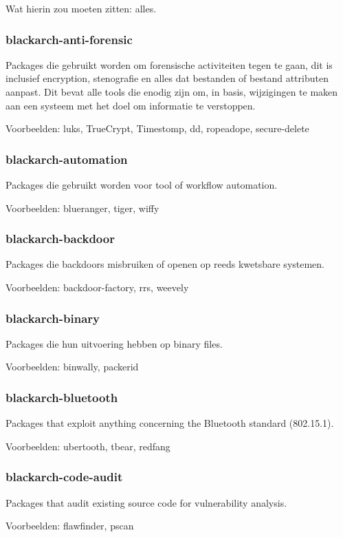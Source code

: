 \documentclass[a4paper, oneside, 11pt]{book}
\begin{document}
Wat hierin zou moeten zitten: alles.

\subsubsection{blackarch-anti-forensic}
Packages die gebruikt worden om forensische activiteiten tegen te gaan,
dit is inclusief encryption, stenografie en alles dat bestanden of bestand attributen aanpast.
Dit bevat alle tools die enodig zijn om, in basis, wijzigingen te maken aan een systeem met het doel om informatie te verstoppen.

Voorbeelden: luks, TrueCrypt, Timestomp, dd, ropeadope, secure-delete

\subsubsection{blackarch-automation}
Packages die gebruikt worden voor tool of workflow automation.

Voorbeelden: blueranger, tiger, wiffy

\subsubsection{blackarch-backdoor}
Packages die backdoors misbruiken of openen op reeds kwetsbare systemen.

Voorbeelden: backdoor-factory, rrs, weevely

\subsubsection{blackarch-binary}
Packages die hun uitvoering hebben op binary files.

Voorbeelden: binwally, packerid

\subsubsection{blackarch-bluetooth}
Packages that exploit anything concerning the Bluetooth standard (802.15.1).

Voorbeelden: ubertooth, tbear, redfang

\subsubsection{blackarch-code-audit}
Packages that audit existing source code for vulnerability analysis.

Voorbeelden: flawfinder, pscan
\end{document}
